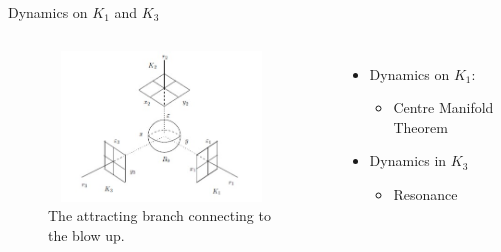 \documentclass[11pt]{beamer}
\begin{document}
\begin{frame}{Dynamics on $K_1$ and $K_3$}
\begin{columns}
\begin{figure}
\centering
\includegraphics[height=4cm,width=6cm]{charts-ball}
\caption{The attracting branch connecting to the blow up.}
\end{figure}
\begin{itemize}
\item Dynamics on $K_1$:
\begin{itemize}
\item Centre Manifold Theorem

\end{itemize}
\item Dynamics in $K_3$
\begin{itemize}
\item Resonance
\end{itemize}
\end{itemize}
\end{columns}
\end{frame}
\end{document}
